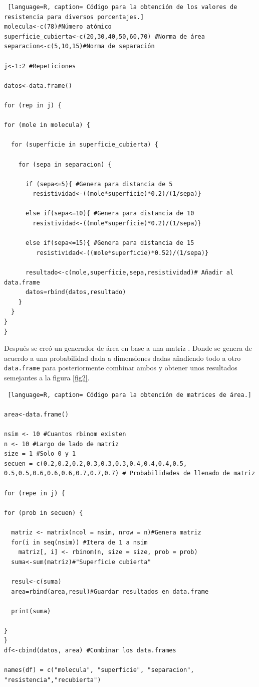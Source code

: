 \documentclass{elsarticle}
\begin{document}
\begin{lstlisting} [language=R, caption= Código para la obtención de los valores de resistencia para diversos porcentajes.] 
molecula<-c(78)#Número atómico
superficie_cubierta<-c(20,30,40,50,60,70) #Norma de área
separacion<-c(5,10,15)#Norma de separación

j<-1:2 #Repeticiones

datos<-data.frame()

for (rep in j) {

for (mole in molecula) {
  
  for (superficie in superficie_cubierta) {
    
    for (sepa in separacion) {
      
      if (sepa<=5){ #Genera para distancia de 5
        resistividad<-((mole*superficie)*0.2)/(1/sepa)}
      
      else if(sepa<=10){ #Genera para distancia de 10
        resistividad<-((mole*superficie)*0.2)/(1/sepa)}
      
      else if(sepa<=15){ #Genera para distancia de 15
         resistividad<-((mole*superficie)*0.52)/(1/sepa)}
      
      resultado<-c(mole,superficie,sepa,resistividad)# Añadir al data.frame
      datos=rbind(datos,resultado)
    }
  }
}
}
\end{lstlisting}

Después se creó un generador de área en base a una matriz \cite{jvanwijk_oliver_2019}. Donde se genera de acuerdo a una probabilidad dada a dimensiones dadas añadiendo todo a otro \texttt{data.frame} para posteriormente combinar ambos y obtener unos resultados semejantes a la figura \ref{fig2}.

\begin{lstlisting} [language=R, caption= Código para la obtención de matrices de área.] 

area<-data.frame()

nsim <- 10 #Cuantos rbinom existen
n <- 10 #Largo de lado de matriz
size = 1 #Solo 0 y 1
secuen = c(0.2,0.2,0.2,0.3,0.3,0.3,0.4,0.4,0.4,0.5,
0.5,0.5,0.6,0.6,0.6,0.7,0.7,0.7) # Probabilidades de llenado de matriz

for (repe in j) {
  
for (prob in secuen) {
  
  matriz <- matrix(ncol = nsim, nrow = n)#Genera matriz
  for(i in seq(nsim)) #Itera de 1 a nsim
    matriz[, i] <- rbinom(n, size = size, prob = prob)
  suma<-sum(matriz)#"Superficie cubierta"
  
  resul<-c(suma)
  area=rbind(area,resul)#Guardar resultados en data.frame
  
  print(suma)
  
}
}
df<-cbind(datos, area) #Combinar los data.frames

names(df) = c("molecula", "superficie", "separacion", "resistencia","recubierta")
\end{lstlisting}
\end{document}
